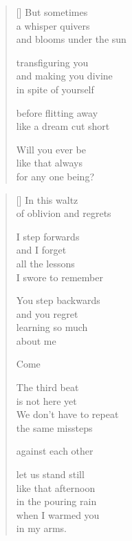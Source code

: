 \documentclass[14pt]{extbook}
\newcommand*{\centeredornament}{\centerline{\pgfornament[width=6cm]{88}}}
\begin{document}
\newpage

\begin{verse}[\versewidth]
  But sometimes \\
  a whisper quivers \\
  and blooms under the sun

  transfiguring you \\
  and making you divine \\
  in spite of yourself

  before flitting away \\
  like a dream cut short

  Will you ever be \\
  like that always \\
  for any one being?
\end{verse}


\newpage

\vspace*{-15mm}
\centeredornament
\vspace*{-7mm}


\settowidth{\versewidth}{We don't have to repeat}

\begin{verse}[\versewidth]
  In this waltz \\
  of oblivion and regrets

  I step forwards \\
  and I forget \\
  all the lessons \\
  I swore to remember

  You step backwards \\
  and you regret \\
  learning so much \\
  about me

  Come

  The third beat \\
  is not here yet \\
  We don't have to repeat \\
  the same missteps

  against each other

  let us stand still \\
  like that afternoon \\
  in the pouring rain \\
  when I warmed you \\
  in my arms.
\end{verse}
\end{document}
